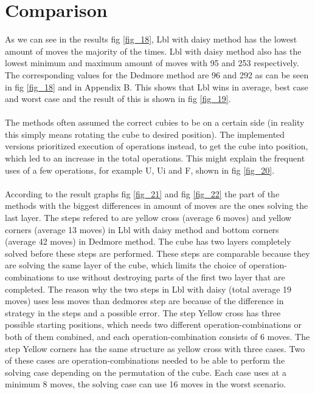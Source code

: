 \documentclass[a4paper,11pt]{kth-mag}
\begin{document}
\section{Comparison}
As we can see in the results fig \ref{fig_18}, Lbl with daisy method has the lowest amount of moves the majority of the times. Lbl with daisy method also has the lowest minimum and maximum amount of moves with 95 and 253 respectively. The corresponding values for the Dedmore method are 96 and 292 as can be seen in fig \ref{fig_18} and in Appendix B. This shows that Lbl wins in average, best case and worst case and the result of this is shown in fig \ref{fig_19}.\\\\
The methods often assumed the correct cubies to be on a certain side (in reality this simply means rotating the cube to desired position). The implemented versions prioritized execution of operations instead, to get the cube into position, which led to an increase in the total operations. This might explain the frequent uses of a few operations, for example U, Ui and F, shown in fig \ref{fig_20}.\\\\
According to the result graphs fig \ref{fig_21} and fig \ref{fig_22} the part of the methods with the biggest differences in amount of moves are the ones solving the last layer. The steps refered to are yellow cross (average 6 moves) and yellow corners (average 13 moves) in Lbl with daisy method and bottom corners (average 42 moves) in Dedmore method. The cube has two layers completely solved before these steps are performed. These steps are comparable because they are solving the same layer of the cube, which limits the choice of operation-combinations to use without destroying parts of the first two layer that are completed.  
The reason why the two steps in Lbl with daisy (total average 19 moves) uses less moves than dedmores step are because of the difference in strategy in the steps and a possible error. 
The step Yellow cross has three possible starting positions, which needs two different operation-combinations or both of them combined, and each operation-combination consists of 6 moves.
The step Yellow corners has the same structure as yellow cross with three cases. Two of these cases are operation-combinations needed to be able to perform the solving case depending on the permutation of the cube. Each case uses at a minimum 8 moves, the solving case can use 16 moves in the worst scenario.
\end{document}
